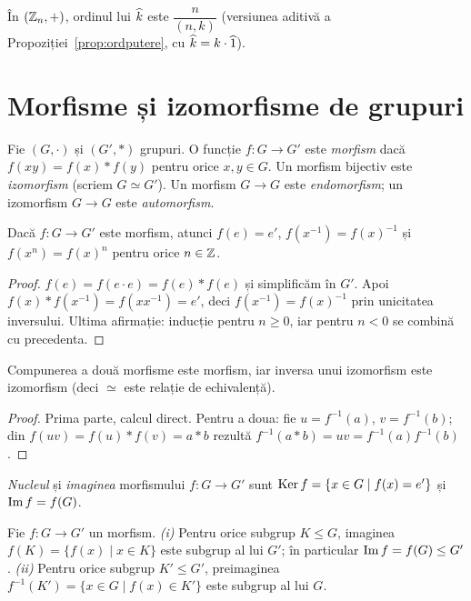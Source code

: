 \begin{exemplu}
În $(\mathbb{Z}_n,+)$, ordinul lui $\widehat{k}$ este $\dfrac{n}{(n,k)}$ (versiunea aditivă a Propoziției~\ref{prop:ordputere}, cu $\widehat{k}=k\cdot\widehat{1}$).
\end{exemplu}

\section{Morfisme și izomorfisme de grupuri}\label{sec:morfisme}

\begin{definitie}
Fie $(G,\cdot)$ și $(G',*)$ grupuri. O funcție $f:G\to G'$ este \emph{morfism} dacă
$f(xy)=f(x)*f(y)$ pentru orice $x,y\in G$. Un morfism bijectiv este \emph{izomorfism} (scriem $G\simeq G'$). Un morfism $G\to G$ este \emph{endomorfism}; un izomorfism $G\to G$ este \emph{automorfism}.
\end{definitie}

\begin{propozitie}\label{prop:morfism}
Dacă $f:G\to G'$ este morfism, atunci $f(e)=e'$, $f(x^{-1})=f(x)^{-1}$ și $f(x^n)=f(x)^n$ pentru orice $n\in\mathbb{Z}$.
\end{propozitie}

\begin{proof}
$f(e)=f(e\cdot e)=f(e)*f(e)$ și simplificăm în $G'$. Apoi $f(x)*f(x^{-1})=f(xx^{-1})=e'$, deci $f(x^{-1})=f(x)^{-1}$ prin unicitatea inversului. Ultima afirmație: inducție pentru $n\ge0$, iar pentru $n<0$ se combină cu precedenta.
\end{proof}

\begin{propozitie}\label{prop:compunere}
Compunerea a două morfisme este morfism, iar inversa unui izomorfism este izomorfism (deci $\simeq$ este relație de echivalență).
\end{propozitie}

\begin{proof}
Prima parte, calcul direct. Pentru a doua: fie $u=f^{-1}(a)$, $v=f^{-1}(b)$; din $f(uv)=f(u)*f(v)=a*b$ rezultă $f^{-1}(a*b)=uv=f^{-1}(a)f^{-1}(b)$.
\end{proof}

\begin{definitie}
\emph{Nucleul} și \emph{imaginea} morfismului $f:G\to G'$ sunt
$\operatorname{Ker} f=\{x\in G\mid f(x)=e'\}$ și $\operatorname{Im} f=f(G)$.
\end{definitie}

\begin{propozitie}\label{prop:imagini}
Fie $f:G\to G'$ un morfism. \emph{(i)} Pentru orice subgrup $K\le G$, imaginea $f(K)=\{f(x)\mid x\in K\}$ este subgrup al lui $G'$; în particular $\operatorname{Im} f=f(G)\le G'$. \emph{(ii)} Pentru orice subgrup $K'\le G'$, preimaginea $f^{-1}(K')=\{x\in G\mid f(x)\in K'\}$ este subgrup al lui $G$.
\end{propozitie}

